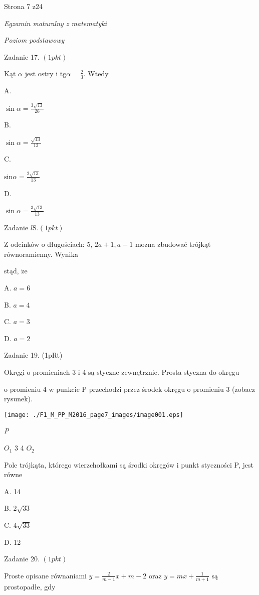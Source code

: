 \documentclass[a4paper,12pt]{article}
\begin{document}
Strona 7 z24





{\it Egzamin maturalny z matematyki}

{\it Poziom podstawowy}

Zadanie 17. $(1pkt)$

Kąt $\alpha$ jest ostry i $\displaystyle \mathrm{t}\mathrm{g}\alpha=\frac{2}{3}$. Wtedy

A.

$\displaystyle \sin\alpha=\frac{3\sqrt{13}}{26}$

B.

$\displaystyle \sin\alpha=\frac{\sqrt{13}}{13}$

C.

$\mathrm{s}$i$\displaystyle \mathrm{n}\alpha=\frac{2\sqrt{13}}{13}$

D.

$\displaystyle \sin\alpha=\frac{3\sqrt{13}}{13}$

Zadanie $l\mathrm{S}. (1pkt)$

$\mathrm{Z}$ odcinków o długościach: 5, $2a+1, a-1$ mozna zbudować trójkąt równoramienny. Wynika

stąd, $\dot{\mathrm{z}}\mathrm{e}$

A. $a=6$

B. $a=4$

C. $a=3$

D. $a=2$

Zadanie 19. (1pRt)

Okręgi o promieniach 3 i 4 są styczne zewnętrznie. Prosta styczna do okręgu

o promieniu 4 w punkcie P przechodzi przez środek okręgu o promieniu 3 (zobacz rysunek).
\begin{center}
\texttt{[image: ./F1\_M\_PP\_M2016\_page7\_images/image001.eps]}
\end{center}
{\it P}

$O_{1}$  3 4  $O_{2}$

Pole trójkąta, którego wierzchołkami są środki okręgów i punkt styczności P, jest równe

A. 14

B. $2\sqrt{33}$

C. $4\sqrt{33}$

D. 12

Zadanie 20. $(1pkt)$

Proste opisane równaniami $y=\displaystyle \frac{2}{m-1}x+m-2$ oraz $y=mx+\displaystyle \frac{1}{m+1}$ są prostopadłe, gdy
\end{document}

